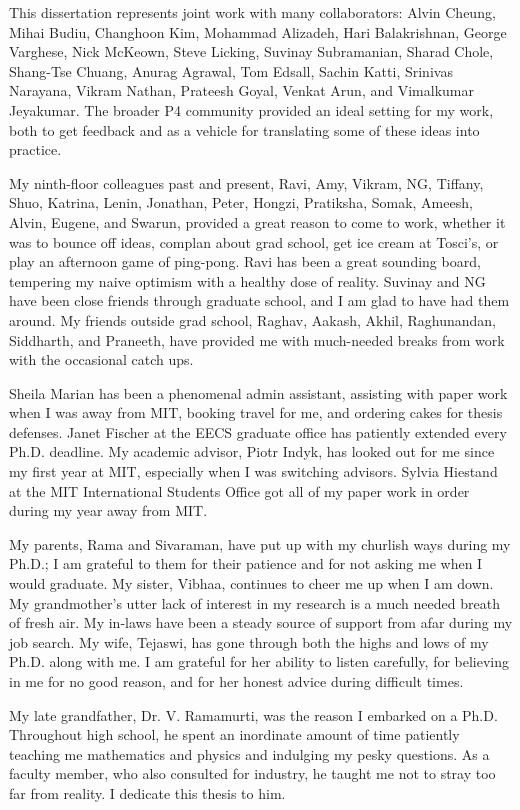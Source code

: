 This dissertation represents joint work with many collaborators: Alvin Cheung,
Mihai Budiu, Changhoon Kim, Mohammad Alizadeh, Hari Balakrishnan, George
Varghese, Nick McKeown, Steve Licking, Suvinay Subramanian, Sharad Chole,
Shang-Tse Chuang, Anurag Agrawal, Tom Edsall, Sachin Katti, Srinivas Narayana,
Vikram Nathan, Prateesh Goyal, Venkat Arun, and Vimalkumar Jeyakumar. The
broader P4 community provided an ideal setting for my work, both to get
feedback and as a vehicle for translating some of these ideas into practice. 

My ninth-floor colleagues past and present, Ravi, Amy, Vikram, NG, Tiffany,
Shuo, Katrina, Lenin, Jonathan, Peter, Hongzi, Pratiksha, Somak, Ameesh, Alvin,
Eugene, and Swarun, provided a great reason to come to work, whether it was to
bounce off ideas, complan about grad school, get ice cream at Tosci's, or play
an afternoon game of ping-pong. Ravi has been a great sounding board, tempering
my naive optimism with a healthy dose of reality. Suvinay and NG have been
close friends through graduate school, and I am glad to have had them around.
My friends outside grad school, Raghav, Aakash, Akhil, Raghunandan, Siddharth,
and Praneeth, have provided me with much-needed breaks from work with the
occasional catch ups.

Sheila Marian has been a phenomenal admin assistant, assisting with paper work
when I was away from MIT, booking travel for me, and ordering cakes for thesis
defenses. Janet Fischer at the EECS graduate office has patiently extended
every Ph.D.  deadline. My academic advisor, Piotr Indyk, has looked out for me
since my first year at MIT, especially when I was switching advisors.  Sylvia
Hiestand at the MIT International Students Office got all of my paper work in
order during my year away from MIT.

My parents, Rama and Sivaraman, have put up with my churlish ways during my
Ph.D.; I am grateful to them for their patience and for not asking me when I
would graduate. My sister, Vibhaa, continues to cheer me up when I am down.  My
grandmother's utter lack of interest in my research is a much needed breath of
fresh air. My in-laws have been a steady source of support from afar during my
job search. My wife, Tejaswi, has gone through both the highs and lows of my
Ph.D. along with me. I am grateful for her ability to listen carefully, for
believing in me for no good reason, and for her honest advice during difficult
times. 

My late grandfather, Dr. V. Ramamurti, was the reason I embarked on a Ph.D.
Throughout high school, he spent an inordinate amount of time patiently
teaching me mathematics and physics and indulging my pesky questions. As a
faculty member, who also consulted for industry, he taught me not to stray too
far from reality. I dedicate this thesis to him.
